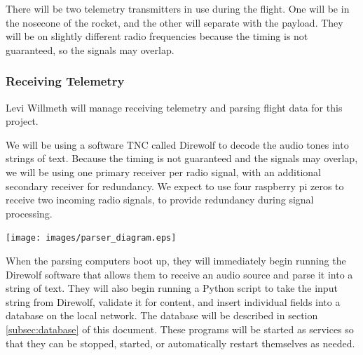 \documentclass[onecolumn, draftclsnofoot, 10pt, compsoc]{IEEEtran}
\begin{document}
There will be two telemetry transmitters in use during the flight.  One will be in the nosecone of the rocket, and the other will separate with the payload.  They will be on slightly different radio frequencies because the timing is not guaranteed, so the signals may overlap.

\subsubsection{Receiving Telemetry}
\label{subsec:telemetry}

Levi Willmeth will manage receiving telemetry and parsing flight data for this project.

We will be using a software TNC called Direwolf to decode the audio tones into strings of text.  Because the timing is not guaranteed and the signals may overlap, we will be using one primary receiver per radio signal, with an additional secondary receiver for redundancy.  We expect to use four raspberry pi zeros to receive two incoming radio signals, to provide redundancy during signal processing.

\begin{center}
	\texttt{[image: images/parser\_diagram.eps]}
    \label{flow-of-data}
\end{center}


When the parsing computers boot up, they will immediately begin running the Direwolf software that allows them to receive an audio source and parse it into a string of text.\cite{direwolf}  They will also begin running a Python script to take the input string from Direwolf, validate it for content, and insert individual fields into a database on the local network.  The database will be described in section \ref{subsec:database} of this document.  These programs will be started as services so that they can be stopped, started, or automatically restart themselves as needed.\cite{script-as-service}\\
\end{document}
